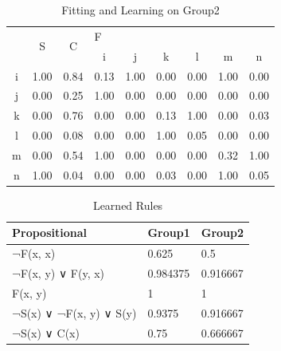 \begin{table}[]
\centering
\begin{tabular}{c|c|c|cccccc}
\hline
\multirow{2}{*}{} & \multirow{2}{*}{S} & \multirow{2}{*}{C} & \multicolumn{6}{l}{F}                   \\ \cline{4-9}
                  &                    &                    & i    & j    & k    & l    & m    & n    \\ \hline
i                 & 1.00               & 0.84               & 0.13 & 1.00 & 0.00 & 0.00 & 1.00 & 0.00 \\
j                 & 0.00               & 0.25               & 1.00 & 0.00 & 0.00 & 0.00 & 0.00 & 0.00 \\
k                 & 0.00               & 0.76               & 0.00 & 0.00 & 0.13 & 1.00 & 0.00 & 0.03 \\
l                 & 0.00               & 0.08               & 0.00 & 0.00 & 1.00 & 0.05 & 0.00 & 0.00 \\
m                 & 0.00               & 0.54               & 1.00 & 0.00 & 0.00 & 0.00 & 0.32 & 1.00 \\
n                 & 1.00               & 0.04               & 0.00 & 0.00 & 0.03 & 0.00 & 1.00 & 0.05 \\ \hline
\end{tabular}
\caption{Fitting and Learning on Group2}
\label{table:learning-group-2}
\end{table}

\begin{table}[]
\centering
\begin{tabular}{lll}
\hline
Propositional           & Group1   & Group2   \\ \hline
¬F(x, x)                & 0.625    & 0.5      \\
¬F(x, y) ∨ F(y, x)      & 0.984375 & 0.916667 \\
F(x, y)                 & 1        & 1        \\
¬S(x) ∨ ¬F(x, y) ∨ S(y) & 0.9375   & 0.916667 \\
¬S(x) ∨ C(x)            & 0.75     & 0.666667 \\ \hline
\end{tabular}
\caption{Learned Rules}
\label{table:learning-learned-rules}
\end{table}
